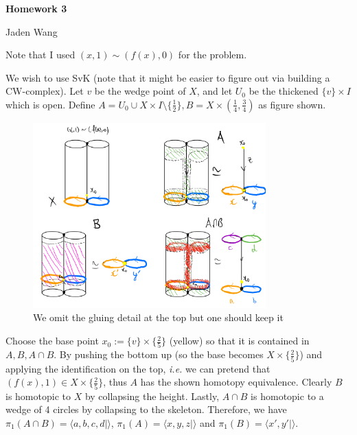 \documentclass[12pt]{article}
\begin{document}
\centerline {\textsf{\textbf{\LARGE{Homework 3}}}}
\centerline {Jaden Wang}
\vspace{.15in}

\begin{problem}[3]
Note that I used $ (x,1) \sim (f(x),0)$ for the problem.

We wish to use SvK (note that it might be easier to figure out via building a CW-complex). Let $ v$ be the wedge point of $ X$, and let $ U_0$ be the thickened $ \{v\} \times I$ which is open. Define $ A = U_0 \cup X \times I \setminus \{\frac{1}{2}\} ,B = X \times \left( \frac{1}{4}, \frac{3}{4} \right) $ as figure shown.
~\begin{figure}[H]
	\centering
	\includegraphics[width=0.8\textwidth]{./figures/svk_mapping_torus.png}
	\caption{We omit the gluing detail at the top but one should keep it}
\end{figure}

Choose the base point $x_0:= \{v\} \times \{\frac{2}{5}\}$ (yellow) so that it is contained in $ A,B,A \cap B$. By pushing the bottom up (so the base becomes $ X \times \{\frac{2}{5}\} $) and applying the identification on the top, \emph{i.e.} we can pretend that $ (f(x),1) \in X \times \{\frac{2}{5}\} $, thus $ A$ has the shown homotopy equivalence. Clearly $ B$ is homotopic to  $ X$ by collapsing the height. Lastly,  $ A \cap B$ is homotopic to a wedge of 4 circles by collapsing to the skeleton. Therefore, we have $ \pi_1( A \cap B) = \langle a,b,c,d| \rangle$, $ \pi_1( A) = \langle x,y,z| \rangle$ and $ \pi_1( B) = \langle x',y'| \rangle$. 


\end{problem}
\end{document}
